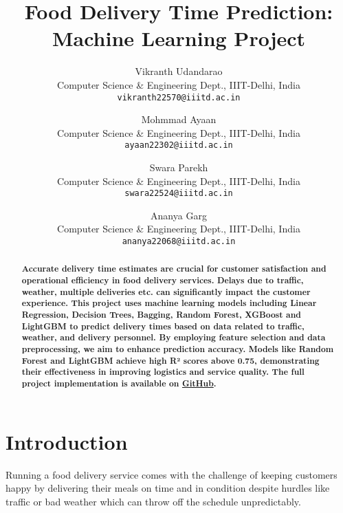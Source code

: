 \documentclass[10pt,twocolumn,letterpaper]{article}
\begin{document}
\title{Food Delivery Time Prediction: Machine Learning Project}

\author{Vikranth Udandarao\\
Computer Science \& Engineering Dept., IIIT-Delhi, India \\
{\tt\small vikranth22570@iiitd.ac.in}
\and
Mohmmad Ayaan \\
Computer Science \& Engineering Dept., IIIT-Delhi, India \\
{\tt\small ayaan22302@iiitd.ac.in}
\and
Swara Parekh \\
Computer Science \& Engineering Dept., IIIT-Delhi, India \\
{\tt\small swara22524@iiitd.ac.in}
\and
Ananya Garg \\
Computer Science \& Engineering Dept., IIIT-Delhi, India \\
{\tt\small ananya22068@iiitd.ac.in}
}

\maketitle

\begin{abstract}
    \textbf{Accurate delivery time estimates are crucial for customer satisfaction and operational efficiency in food delivery services. Delays due to traffic, weather, multiple deliveries etc. can significantly impact the customer experience. This project uses machine learning models including Linear Regression, Decision Trees, Bagging, Random Forest, XGBoost and LightGBM to predict delivery times based on data related to traffic, weather, and delivery personnel. By employing feature selection and data preprocessing, we aim to enhance prediction accuracy. Models like Random Forest and LightGBM achieve high R² scores above 0.75, demonstrating their effectiveness in improving logistics and service quality. The full project implementation is available on \href{https://github.com/Vikranth3140/Food-Delivery-Time-Prediction}{GitHub}.}
\end{abstract}

\section{Introduction}
Running a food delivery service comes with the challenge of keeping customers happy by delivering their meals on time and in condition despite hurdles like traffic or bad weather which can throw off the schedule unpredictably.
\end{document}
